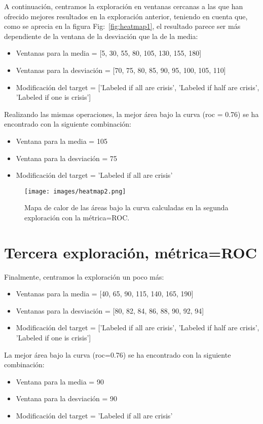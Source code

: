 \documentclass[a4paper,12pt,twoside,oldfontcommands]{memoir}
\begin{document}
A continuación, centramos la exploración en ventanas cercanas a las que han ofrecido mejores resultados en la exploración anterior, teniendo en cuenta que, como se aprecia en la figura Fig:~\ref{fig:heatmap1}, el resultado parece ser más dependiente de la ventana de la desviación que la de la media: 
\begin{itemize}
    \item Ventanas para la media = [5, 30, 55, 80, 105, 130, 155, 180]
    \item Ventanas para la desviación = [70, 75, 80, 85, 90, 95, 100, 105, 110]
    \item Modificación del target = ['Labeled if all are crisis', 'Labeled if half are crisis', 'Labeled if one is crisis']
\end{itemize}

Realizando las mismas operaciones, la mejor área bajo la curva (roc = 0.76) se ha encontrado con la siguiente combinación: 
\begin{itemize}
    \item Ventana para la media = 105
    \item Ventana para la desviación = 75
    \item Modificación del target = 'Labeled if all are crisis'
\end{itemize}

\begin{figure}
    \centering
    \texttt{[image: images/heatmap2.png]}
    \caption{Mapa de calor de las áreas bajo la curva calculadas en la segunda exploración con la métrica=ROC.}
    \label{fig:heatmap2}
\end{figure}

\section{Tercera exploración, métrica=ROC}
Finalmente, centramos la exploración un poco más: 
\begin{itemize}
    \item Ventanas para la media = [40, 65, 90, 115, 140, 165, 190]
    \item Ventanas para la desviación = [80, 82, 84, 86, 88, 90, 92, 94]
    \item Modificación del target = ['Labeled if all are crisis', 'Labeled if half are crisis', 'Labeled if one is crisis']
\end{itemize}

La mejor área bajo la curva (roc=0.76) se ha encontrado con la siguiente combinación: 
\begin{itemize}
    \item Ventana para la media = 90
    \item Ventana para la desviación = 90
    \item Modificación del target = 'Labeled if all are crisis'
\end{itemize}
\end{document}

